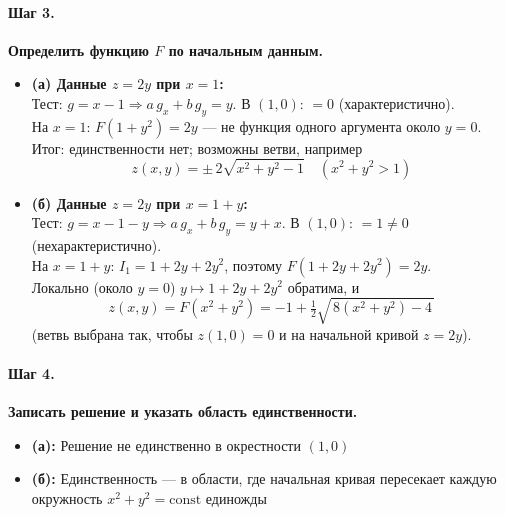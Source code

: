\paragraph{Шаг 3.} \textbf{Определить функцию \(F\) по начальным данным.}\\
\begin{itemize}
\item \textbf{(а) Данные \(z=2y\) при \(x=1\):}\\
Тест: \(g=x-1\Rightarrow a\,g_x+b\,g_y=y\). В \((1,0)\): \(=0\) (характеристично).\\
На \(x=1\): \(F(1+y^2)=2y\) — не функция одного аргумента около \(y=0\).\\
Итог: единственности нет; возможны ветви, например
\[
z(x,y)=\pm\,2\sqrt{x^2+y^2-1}\quad (x^2+y^2>1)
\]

\item \textbf{(б) Данные \(z=2y\) при \(x=1+y\):}\\
Тест: \(g=x-1-y\Rightarrow a\,g_x+b\,g_y=y+x\). В \((1,0)\): \(=1\neq0\) (нехарактеристично).\\
На \(x=1+y\): \(I_1=1+2y+2y^2\), поэтому \(F(1+2y+2y^2)=2y\).\\
Локально (около \(y=0\)) \(y\mapsto 1+2y+2y^2\) обратима, и
\[
z(x,y)=F(x^2+y^2)=-1+\tfrac12\sqrt{\,8(x^2+y^2)-4\,}
\]
(ветвь выбрана так, чтобы \(z(1,0)=0\) и на начальной кривой \(z=2y\)).
\end{itemize}

\paragraph{Шаг 4.} \textbf{Записать решение и указать область единственности.}\\
\begin{itemize}
\item \textbf{(а):} Решение не единственно в окрестности \((1,0)\)
\item \textbf{(б):} Единственность — в области, где начальная кривая пересекает каждую окружность \(x^2+y^2=\mathrm{const}\) единожды
\end{itemize}

